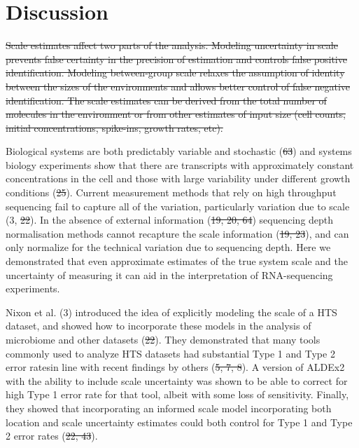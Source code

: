 \documentclass[
]{article}
\providecommand{\DIFadd}[1]{{\protect\color{blue}\uwave{#1}}} %
\providecommand{\DIFdel}[1]{{\protect\color{red}\sout{#1}}}                      %
\providecommand{\DIFaddbegin}{} %
\providecommand{\DIFaddend}{} %
\providecommand{\DIFdelbegin}{} %
\providecommand{\DIFdelend}{} %
\newcommand{\DIFscaledelfig}{0.5}
\newlength{\DIFdelgraphicswidth} %
\newlength{\DIFdelgraphicsheight} %
\newcommand{\DIFaddincludegraphics}[2][]{{\color{blue}\fbox{\DIFOincludegraphics[#1]{#2}}}} %
\newcommand{\DIFdelincludegraphics}[2][]{%
\sbox{\DIFdelgraphicsbox}{\DIFOincludegraphics[#1]{#2}}%
\settoboxwidth{\DIFdelgraphicswidth}{\DIFdelgraphicsbox} %
\settoboxtotalheight{\DIFdelgraphicsheight}{\DIFdelgraphicsbox} %
\scalebox{\DIFscaledelfig}{%
\parbox[b]{\DIFdelgraphicswidth}{\usebox{\DIFdelgraphicsbox}\\[-\baselineskip] \rule{\DIFdelgraphicswidth}{0em}}\llap{\resizebox{\DIFdelgraphicswidth}{\DIFdelgraphicsheight}{%
\setlength{\unitlength}{\DIFdelgraphicswidth}%
\begin{picture}(1,1)%
\thicklines\linethickness{2pt} %
{\color[rgb]{1,0,0}\put(0,0){\framebox(1,1){}}}%
{\color[rgb]{1,0,0}\put(0,0){\line( 1,1){1}}}%
{\color[rgb]{1,0,0}\put(0,1){\line(1,-1){1}}}%
\end{picture}%
}\hspace*{3pt}}} %
} %
\DeclareRobustCommand{\DIFaddbegin}{\DIFOaddbegin \let\includegraphics\DIFaddincludegraphics} %
\DeclareRobustCommand{\DIFaddend}{\DIFOaddend \let\includegraphics\DIFOincludegraphics} %
\DeclareRobustCommand{\DIFdelbegin}{\DIFOdelbegin \let\includegraphics\DIFdelincludegraphics} %
\DeclareRobustCommand{\DIFdelend}{\DIFOaddend \let\includegraphics\DIFOincludegraphics} %
\begin{document}
\section{Discussion}\label{discussion}

\DIFdelbegin \DIFdel{Scale estimates affect two parts of the analysis. Modeling uncertainty
in scale prevents false certainty in the precision of estimation and
controls false positive identification. Modeling between-group scale
relaxes the assumption of identity between the sizes of the environments
and allows better control of false negative identification. The scale
estimates can be derived from the total number of molecules in the
environment or from other estimates of input size (cell counts, initial
concentrations, spike-ins, growth rates, etc).
}%

\DIFdelend Biological systems are both predictably variable and stochastic (\DIFdelbegin \DIFdel{63}\DIFdelend \DIFaddbegin \DIFadd{49}\DIFaddend ) and
systems biology experiments show that there are transcripts with
approximately constant concentrations in the cell and those with large
variability under different growth conditions (\DIFdelbegin \DIFdel{25}\DIFdelend \DIFaddbegin \DIFadd{23}\DIFaddend ). Current measurement
methods that rely on high throughput sequencing fail to capture all of
the variation, particularly variation due to scale (3, \DIFdelbegin \DIFdel{22}\DIFdelend \DIFaddbegin \DIFadd{20}\DIFaddend ). In the
absence of external information (\DIFdelbegin \DIFdel{19, 20, 64}\DIFdelend \DIFaddbegin \DIFadd{5, 6, 55}\DIFaddend ) sequencing depth
normalisation methods cannot recapture the scale information (\DIFdelbegin \DIFdel{19, 23}\DIFdelend \DIFaddbegin \DIFadd{5, 21}\DIFaddend ),
and can only normalize for the technical variation due to sequencing
depth. Here we demonstrated that even approximate estimates of the true
system scale and the uncertainty of measuring it can aid in the
interpretation of RNA-sequencing experiments.

Nixon et al. (3) introduced the idea of explicitly modeling the scale of
a HTS dataset, and showed how to incorporate these models in the
analysis of microbiome and other datasets (\DIFdelbegin \DIFdel{22}\DIFdelend \DIFaddbegin \DIFadd{20}\DIFaddend ). They demonstrated that
many tools commonly used to analyze HTS datasets had substantial Type 1
and Type 2 error rates\DIFaddbegin \DIFadd{, }\DIFaddend in line with recent findings by others (\DIFdelbegin \DIFdel{5, 7,
8}\DIFdelend \DIFaddbegin \DIFadd{10, 12,
13}\DIFaddend ). A version of ALDEx2 with the ability to include scale uncertainty
was shown to be able to correct for \DIFaddbegin \DIFadd{the }\DIFaddend high Type 1 error rate for that
tool, albeit with some loss of sensitivity. Finally, they showed that
incorporating an informed scale model incorporating both location and
scale uncertainty estimates could both control for Type 1 and Type 2
error rates (\DIFdelbegin \DIFdel{22, 43}\DIFdelend \DIFaddbegin \DIFadd{20}\DIFaddend ).
\end{document}
